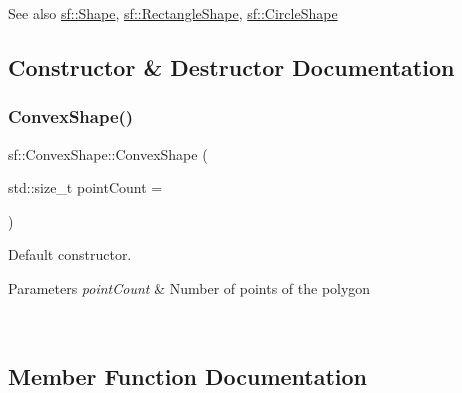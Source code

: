 \begin{DoxySeeAlso}{See also}
\mbox{\hyperlink{classsf_1_1_shape}{sf\+::\+Shape}}, \mbox{\hyperlink{classsf_1_1_rectangle_shape}{sf\+::\+Rectangle\+Shape}}, \mbox{\hyperlink{classsf_1_1_circle_shape}{sf\+::\+Circle\+Shape}} \begin{DoxyVerb}\end{DoxyVerb}
 
\end{DoxySeeAlso}


\subsection{Constructor \& Destructor Documentation}
\mbox{\label{classsf_1_1_convex_shape_af9981b8909569b381b3fccf32fc69856}} 
\subsubsection{\texorpdfstring{ConvexShape()}{ConvexShape()}}
{\footnotesize\ttfamily sf\+::\+Convex\+Shape\+::\+Convex\+Shape (\begin{DoxyParamCaption}\item[{std\+::size\+\_\+t}]{point\+Count = {} }\end{DoxyParamCaption})\hspace{0.3cm}{\ttfamily [explicit]}}



Default constructor. 


\begin{DoxyParams}{Parameters}
{\em point\+Count} & Number of points of the polygon \begin{DoxyVerb}\end{DoxyVerb}
 \\
\hline
\end{DoxyParams}


\subsection{Member Function Documentation}
\mbox{\label{classsf_1_1_convex_shape_a72a97bc426d8daf4d682a20fcb7f3fe7}} 
